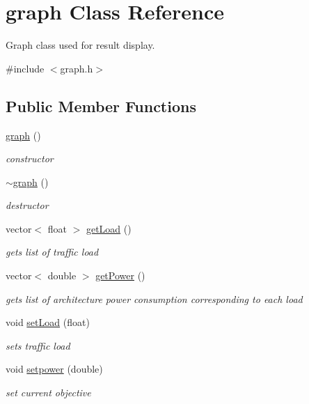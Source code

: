 \hypertarget{classgraph}{
\section{graph Class Reference}
\label{classgraph}
}


Graph class used for result display.  




{\ttfamily \#include $<$graph.h$>$}

\subsection*{Public Member Functions}
\begin{DoxyCompactItemize}
\item 
\hyperlink{classgraph_a6aaa56b4528d2fdb8f0ecd97e04f6651}{graph} ()
\begin{DoxyCompactList}\small\item\em constructor \item\end{DoxyCompactList}\item 
\hyperlink{classgraph_aeb62eaf197cdcb4800fa016eebc3d55a}{$\sim$graph} ()
\begin{DoxyCompactList}\small\item\em destructor \item\end{DoxyCompactList}\item 
vector$<$ float $>$ \hyperlink{classgraph_ab3640a345a45d78395b84a314cfaa6e9}{getLoad} ()
\begin{DoxyCompactList}\small\item\em gets list of traffic load \item\end{DoxyCompactList}\item 
vector$<$ double $>$ \hyperlink{classgraph_af576a52d2b39a3126dbf6cf56011a3ae}{getPower} ()
\begin{DoxyCompactList}\small\item\em gets list of architecture power consumption corresponding to each load \item\end{DoxyCompactList}\item 
void \hyperlink{classgraph_af551af99376a1d3fa4e0181a682aa224}{setLoad} (float)
\begin{DoxyCompactList}\small\item\em sets traffic load \item\end{DoxyCompactList}\item 
void \hyperlink{classgraph_ac78fb63912db679ad11b55dd25021145}{setpower} (double)
\begin{DoxyCompactList}\small\item\em set current objective \item\end{DoxyCompactList}\end{DoxyCompactItemize}


